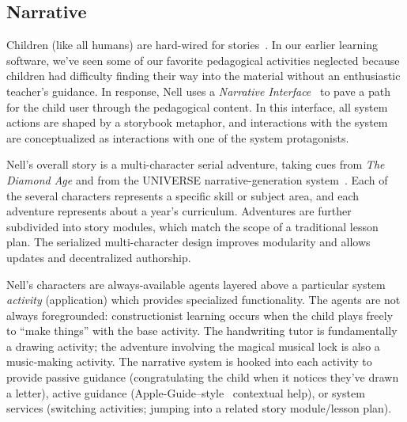 \documentclass[preprint]{sig-alternate}
\begin{document}

\subsection{Narrative}

Children (like all humans) are hard-wired for stories~\cite{boyd:stories}.
In our earlier learning software, we've seen some of our favorite
pedagogical activities neglected because children had difficulty
finding their way into the material without an enthusiastic teacher's
guidance.  In response, Nell uses a
\textit{Narrative Interface}~\cite{bizzocchi:narrative,don:narrative}
to pave a path for the child user through the pedagogical content.
In this interface, all system actions are shaped by a storybook metaphor, and
interactions with the system are conceptualized as interactions with one of the
system protagonists.

Nell's overall story is a multi-character serial adventure, taking
cues from \textit{The Diamond Age} and
from the UNIVERSE narrative-generation system~\cite{lebowitz:universe85}.
Each of the several characters represents a specific skill or subject
area, and each adventure represents about a year's curriculum.
Adventures are further subdivided into story modules, which match the
scope of a traditional lesson plan.  The serialized multi-character
design improves modularity and allows updates and decentralized
authorship.


Nell's characters are
always-available agents layered above a particular system \textit{activity}
(application) which provides specialized functionality.  The agents
are not always foregrounded: constructionist learning occurs when the
child plays freely to ``make things'' with the base activity.
The handwriting tutor is fundamentally a drawing activity; the
adventure involving the magical musical lock is also a music-making activity.
The narrative system is
hooked into each activity to provide passive guidance
(congratulating the child when it notices they've drawn a letter),
active guidance (Apple-Guide--style~\cite{powers:appleguide}
contextual help), or system services (switching activities; jumping into a
related story module/lesson plan).
\end{document}
